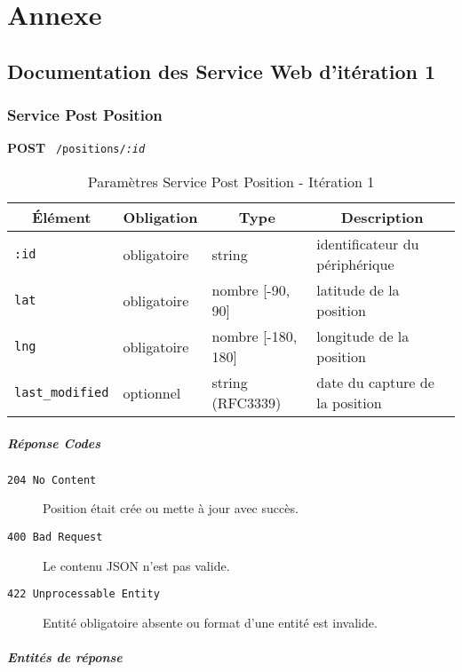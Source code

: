 \section{Annexe}
\pagebreak

\subsection{Documentation des Service Web d'itération 1}

\subsubsection{Service Post Position}
\label{appendix:sprint1-position-post-doc}

\textbf{POST} \ \texttt{/positions/\textit{:id}}

\begin{table}[htbp]
    \centering
    \caption{Paramètres Service Post Position - Itération 1}
    \begin{tabular}{|l | l | l | l|}
        \hline
        \multicolumn{1}{|c|}{\textbf{Élément}} &
        \multicolumn{1}{c|}{\textbf{Obligation}} &
        \multicolumn{1}{c|}{\textbf{Type}} &
        \multicolumn{1}{c|}{\textbf{Description}} \\ \hline
        \verb|:id| & obligatoire & string & identificateur du périphérique \\ \hline
        \verb|lat| & obligatoire & nombre [-90, 90] & latitude de la position \\ \hline
        \verb|lng| & obligatoire & nombre [-180, 180] & longitude de la position \\ \hline
        \verb|last_modified| & optionnel & string (RFC3339) & date du capture de la position \\ \hline
    \end{tabular}
\end{table}
 
\subparagraph*{Réponse Codes}
\begin{description}
    \item[\texttt{204 No Content}] Position était crée ou mette à jour avec succès.
    \item[\texttt{400 Bad Request}] Le contenu JSON n'est pas valide.
    \item[\texttt{422 Unprocessable Entity}] Entité obligatoire absente ou format d'une entité est invalide.
\end{description}

\subparagraph*{Entités de réponse}

